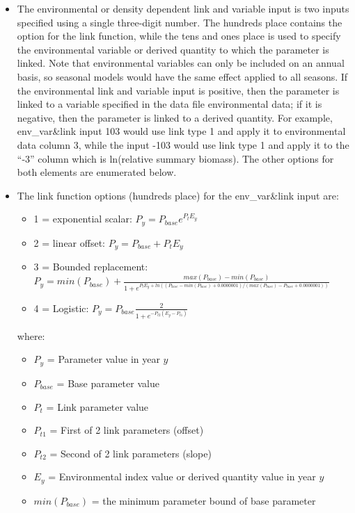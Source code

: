 \begin{itemize}
	\begin{itemize}
	   \item The environmental or density dependent link and variable input is two inputs specified using a single three-digit number. The hundreds place contains the option for the link function, while the tens and ones place is used to specify the environmental variable or derived quantity to which the parameter is linked. Note that environmental variables can only be included on an annual basis, so seasonal models would have the same effect applied to all seasons. If the environmental link and variable input is positive, then the parameter is linked to a variable specified in the data file environmental data; if it is negative, then the parameter is linked to a derived quantity. For example, env\_var\&link input 103 would use link type 1 and apply it to environmental data column 3, while the input -103  would use link type 1 and apply it to the ``-3'' column which is ln(relative summary biomass). The other options for both elements are enumerated below.
	   \item The link function options (hundreds place) for the env\_var\&link input are:
	   \begin{itemize}
	       \item 1 = exponential scalar: $P_{y} = P_{base}e^{P_{t}E_{y}}$
		   \item 2 = linear offset: $P_{y} = P_{base} + P_{t}E_{y}$
		   \item 3 = Bounded replacement: $P_{y} = min(P_{base})+\frac{max(P_{base})-min(P_{base})}{1+e^{P_tE_y+ln((P_{base}-min(P_{base})+0.0000001)/(max(P_{base})-P_{base}+0.0000001))}}$
		   \item 4 = Logistic: $P_{y} = P_{base}\frac{2}{1+e^{-P_{t2}(E_{y}-P_{t1})}}$
	   \end{itemize}
		where:
	   \begin{itemize}
	       \item $P_{y}$ = Parameter value in year $y$
           \item $P_{base}$ = Base parameter value
           \item $P_{t}$ = Link parameter value
           \item $P_{t1}$ = First of 2 link parameters (offset)
           \item $P_{t2}$ = Second of 2 link parameters (slope)
           \item $E_{y}$ = Environmental index value or derived quantity value in year $y$
           \item $min(P_{base})$ = the minimum parameter bound of base parameter

\end{itemize}
\end{itemize}
\end{itemize}
